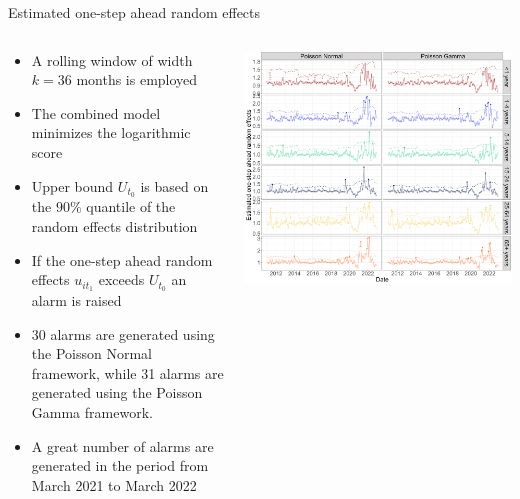 \documentclass[aspectratio=169,handout]{beamer}
\begin{document}
\begin{frame}{Estimated one-step ahead random effects}
\begin{columns}
\begin{column}{.50\textwidth}
\begin{itemize}
  \item<1> A rolling window of width $k=36$ months is employed
  \item<1> The combined model minimizes the logarithmic score  
  \item<1> Upper bound $U_{t_0}$ is based on the $90\%$ quantile of the random effects distribution
  \item<1> If the one-step ahead random effects $u_{it_1}$ exceeds $U_{t_0}$ an alarm is raised
\end{itemize}
\vspace{.1cm}
\begin{itemize}
  \item<2> 30 alarms are generated using the Poisson Normal framework, while 31 alarms are generated using the Poisson Gamma framework.
  \item<2> A great number of alarms are generated in the period from March 2021 to March 2022
\end{itemize}
\end{column}
\hfill
\begin{column}{.46\textwidth}

 \tiny


\includegraphics[width=1\linewidth]{../../figures/Compare_novel_STEC} 

 \normalsize
\end{column}
\end{columns}
\end{frame}
\end{document}
